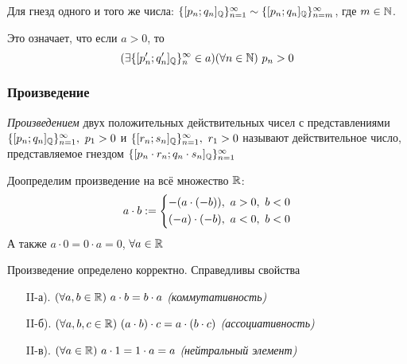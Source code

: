 \begin{note}
    Для гнезд одного и того же числа:
    $\{[p_n; q_n]_{\mathbb{Q}}\}_{n = 1}^\infty \sim
    \{[p_n; q_n]_{\mathbb{Q}}\}_{n = m}^\infty$, где $m \in \mathbb{N}$.

    Это означает, что если $a > 0$, то
    \[
    (\exists \{[p'_n; q'_n]_{\mathbb{Q}}\}_{n}^\infty \in a)
    (\forall n \in \mathbb{N})\ p_n > 0
    \]
\end{note}

\subsubsection*{Произведение}

\begin{definition}
    \textit{Произведением} двух положительных действительных
    чисел с представлениями
    $\{[p_n;q_n]_{\mathbb{Q}}\}_{n = 1}^\infty,\ p_1 > 0$ и
    $\{[r_n;s_n]_{\mathbb{Q}}\}_{n = 1}^\infty,\ r_1 > 0$ называют
    действительное число, представляемое гнездом
    $\{[p_n \cdot r_n;q_n \cdot s_n]_{\mathbb{Q}}\}_{n = 1}^\infty$
\end{definition}

Доопределим произведение на всё множество $\mathbb{R}$:
\[
	a \cdot b := \left\{\begin{aligned}
		&{-(a \cdot (-b)),\ a > 0,\ b < 0}
		\\
		&{(-a) \cdot (-b),\ a < 0,\ b < 0}
	\end{aligned}\right.
\]
А также $a \cdot 0 = 0 \cdot a = 0$, $\forall a \in \mathbb{R}$

\begin{theorem}
    Произведение определено корректно. Справедливы свойства

    \begin{enumerate}
        \item[II-а).] $(\forall a, b \in \mathbb{R}) \ a
            \cdot b = b \cdot a$ \textit{(коммутативность)}
        \item[II-б).] $(\forall a, b, c \in \R)\ 
            (a \cdot b) \cdot c = a \cdot (b \cdot c)$ \textit{(ассоциативность)}
        \item[II-в).] $(\forall a \in \mathbb{R}) \ a \cdot
            1 = 1 \cdot a = a$ \textit{(нейтральный элемент)}
    \end{enumerate}
\end{theorem}

